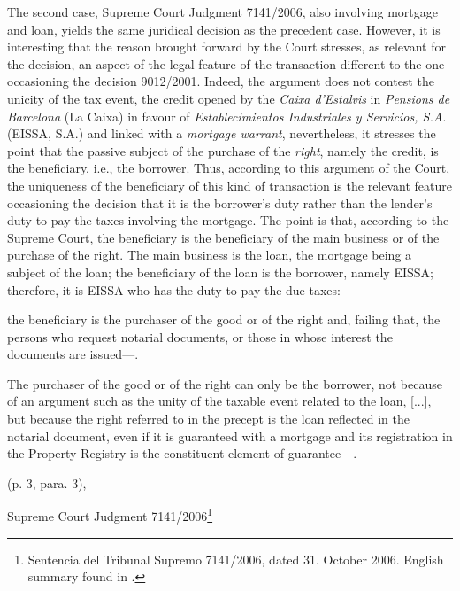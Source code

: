 			The second case, Supreme Court Judgment 7141/2006, also involving mortgage and loan, yields the same juridical decision as the precedent case. However, it is interesting that the reason brought forward by the Court stresses, as relevant for the decision, an aspect of the legal feature of the transaction different to the one occasioning the decision 9012/2001. Indeed, the argument does not contest the unicity of the tax event, the credit opened by the \textit{Caixa d’Estalvis} in \textit{Pensions de Barcelona} (La Caixa) in favour of \textit{Establecimientos Industriales y Servicios, S.A.} (EISSA, S.A.) and linked with a \textit{mortgage warrant}, nevertheless, it stresses the point that the passive subject of the purchase of the \textit{right}, namely the credit, is the beneficiary, i.e., the borrower. Thus, according to this argument of the Court, the uniqueness of the beneficiary of this kind of transaction is the relevant feature occasioning the decision that it is the borrower’s duty rather than the lender’s duty to pay the taxes involving the mortgage. The point is that, according to the Supreme Court, the beneficiary is the beneficiary of the main business or of the purchase of the right. The main business is the loan, the mortgage being a subject of the loan; the beneficiary of the loan is the borrower, namely EISSA; therefore, it is EISSA who has the duty to pay the due taxes:
				\begin{itquote}
					[...] the beneficiary is the purchaser of the good or of the right and, failing that, the persons who request notarial documents, or those in whose interest the documents are issued—.
				\end{itquote} 
				\begin{itquote}
					[...] The purchaser of the good or of the right can only be the borrower, not because of an argument such as the unity of the taxable event related to the loan, [...], but because the right referred to in the precept is the loan reflected in the notarial document, even if it is guaranteed with a mortgage and its registration in the Property Registry is the constituent element of guarantee—. 
				\end{itquote} 
				\hfill (p. 3, para. 3), 
				
				\hfill Supreme Court Judgment 7141/2006\footnote{Sentencia del Tribunal Supremo 7141/2006, dated 31. October 2006. English summary found in \textcite[pp. 247-249]{martinez2022elements}.}\medskip
			
